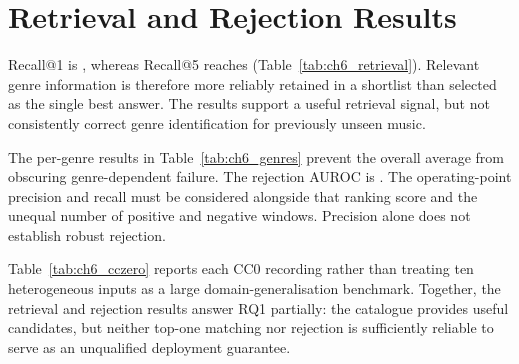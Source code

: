 \section{Retrieval and Rejection Results}

\begin{table}[tb]
\centering\small

\caption{Strict leave-one-music-out genre retrieval (60 music identities) and
descriptive window-level rejection (750 windows from 30 recordings)}
\label{tab:ch6_retrieval}
\end{table}

Recall@1 is \ChSixRecallOne{}, whereas Recall@5 reaches \ChSixRecallFive{}
(Table~\ref{tab:ch6_retrieval}). Relevant genre information is therefore more
reliably retained in a shortlist than selected as the single best answer. The
results support a useful retrieval signal, but not consistently correct genre
identification for previously unseen music.

\begin{table}[tb]
\centering\small

\caption{Per-genre leave-one-music-out results. Each genre has six music
identities. Codes: BR = breaking; HO = house; JB = ballet jazz;
JS = street jazz; KR = krump; LH = LA-style hip-hop; LO = locking;
MH = middle hip-hop; PO = popping; WA = waacking
\cite{tsuchida2019aist,li2021ai}}
\label{tab:ch6_genres}
\end{table}

The per-genre results in Table~\ref{tab:ch6_genres} prevent the overall average
from obscuring genre-dependent failure. The rejection AUROC is
\ChSixRejectAuroc{}. The operating-point precision and recall must be considered
alongside that ranking score and the unequal number of positive and negative
windows. Precision alone does not establish robust rejection.

\begin{table}[tb]
\centering\scriptsize

\caption{Per-recording CC0 results from offline query evaluation}
\label{tab:ch6_cczero}
\end{table}

Table~\ref{tab:ch6_cczero} reports each CC0 recording rather than treating ten
heterogeneous inputs as a large domain-generalisation benchmark. Together, the
retrieval and rejection results answer RQ1 partially: the catalogue provides
useful candidates, but neither top-one matching nor rejection is sufficiently
reliable to serve as an unqualified deployment guarantee.

